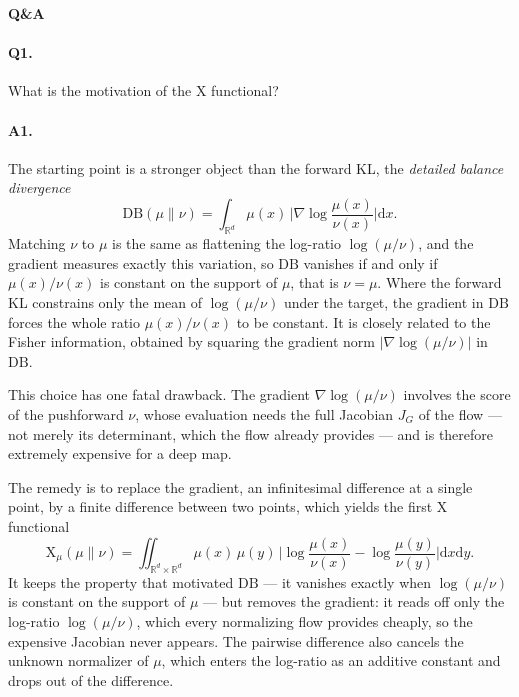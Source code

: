\documentclass{article}
\newcommand{\D}{\mathrm{d}}
\newcommand{\X}{\mathrm{X}}
\newcommand{\DB}{\mathrm{DB}}
\begin{document}
\begin{center}
    {\large\textbf{Q\&A}}
\end{center}

\paragraph{Q1.} What is the motivation of the X functional?

\paragraph{A1.} The starting point is a stronger object than the forward KL, the
\emph{detailed balance divergence}
\begin{equation*}
    \DB(\mu\|\nu) = \int_{\mathbb R^d} \mu(x)\,
    \biggl| \nabla \log \frac{\mu(x)}{\nu(x)} \biggr| \D x .
\end{equation*}
Matching $\nu$ to $\mu$ is the same as flattening the log-ratio $\log(\mu/\nu)$,
and the gradient measures exactly this variation, so $\DB$ vanishes if and only
if $\mu(x)/\nu(x)$ is constant on the support of $\mu$, that is $\nu = \mu$.
Where the forward KL constrains only the mean of $\log(\mu/\nu)$ under the
target, the gradient in $\DB$ forces the whole ratio $\mu(x)/\nu(x)$ to be
constant. It is closely related to the Fisher information, obtained by squaring
the gradient norm $|\nabla \log(\mu/\nu)|$ in $\DB$.

This choice has one fatal drawback. The gradient $\nabla \log(\mu/\nu)$ involves
the score of the pushforward $\nu$, whose evaluation needs the full Jacobian
$J_G$ of the flow --- not merely its determinant, which the flow already
provides --- and is therefore extremely expensive for a deep map.

The remedy is to replace the gradient, an infinitesimal difference at a single
point, by a finite difference between two points, which yields the first X
functional
\begin{equation*}
    \X_\mu(\mu\|\nu) = \iint_{\mathbb R^d\times\mathbb R^d} \mu(x)\,\mu(y)\,
    \biggl| \log\frac{\mu(x)}{\nu(x)} - \log\frac{\mu(y)}{\nu(y)} \biggr|
    \D x \D y .
\end{equation*}
It keeps the property that motivated $\DB$ --- it vanishes exactly when
$\log(\mu/\nu)$ is constant on the support of $\mu$ --- but removes the gradient:
it reads off only the log-ratio $\log(\mu/\nu)$, which every normalizing flow
provides cheaply, so the expensive Jacobian never appears. The pairwise
difference also cancels the unknown normalizer of $\mu$, which enters the
log-ratio as an additive constant and drops out of the difference.
\end{document}
